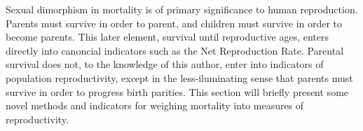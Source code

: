  \FloatBarrier
Sexual dimorphism in mortality is of primary significance to human reproduction.
Parents must survive in order to parent, and children must survive in order to
become parents. This later element, survival until reproductive ages, enters
directly into canoncial indicators such as the Net Reproduction Rate. Parental
survival does not, to the knowledge of this author, enter into indicators of
population reproductivity, except in the less-iluminating
sense that parents must survive in order to progress birth parities. This section will briefly present 
some novel methods and indicators for weighing mortality into measures of
reproductivity.

